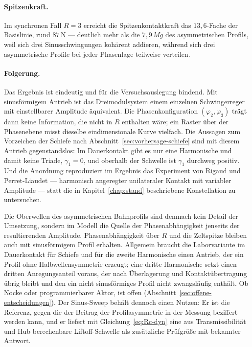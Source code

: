 \documentclass[12pt,a4paper]{report}
\begin{document}
\paragraph{Spitzenkraft.}
Im synchronen Fall $R = 3$ erreicht die Spitzenkontaktkraft das
$13{,}6$-Fache der Basislinie, rund $87\,\mathrm{N}$ --- deutlich mehr
als die $7{,}9\,Mg$ des asymmetrischen Profils, weil sich drei
Sinusschwingungen kohärent addieren, während sich drei asymmetrische
Profile bei jeder Phasenlage teilweise verteilen.

\paragraph{Folgerung.}
Das Ergebnis ist eindeutig und für die Versuchsauslegung bindend. Mit
sinusförmigem Antrieb ist das Dreimodulsystem einem einzelnen
Schwingerreger mit einstellbarer Amplitude äquivalent. Die
Phasenkonfiguration $(\varphi_2, \varphi_3)$ trägt dann keine
Information, die nicht in $R$ enthalten wäre; ein Raster über der
Phasenebene misst dieselbe eindimensionale Kurve vielfach. Die
Aussagen zum Vorzeichen der Schiefe nach
Abschnitt~\ref{sec:vorhersage-schiefe} sind mit diesem Antrieb
gegenstandslos: Im Dauerkontakt gibt es nur eine Harmonische und damit
keine Triade, $\gamma_1 = 0$, und oberhalb der Schwelle ist $\gamma_1$
durchweg positiv. Und die
Anordnung reproduziert im Ergebnis das Experiment von Rigaud und
Perret-Liaudet \cite{rigaud2003} --- harmonisch angeregter unilateraler
Kontakt mit variabler Amplitude --- statt die in
Kapitel~\ref{chap:stand} beschriebene Konstellation zu untersuchen.

Die Oberwellen des asymmetrischen Bahnprofils sind demnach kein Detail
der Umsetzung, sondern im Modell die Quelle der Phasenabhängigkeit
jenseits der resultierenden Amplitude. Phasenabhängigkeit über $R$ und
die Zeltspitze bleiben auch mit sinusförmigem Profil erhalten. Allgemein
braucht die Laborvariante im Dauerkontakt für Schiefe und für die zweite
Harmonische einen Antrieb, der ein Profil ohne Halbwellensymmetrie
erzeugt; eine dritte Harmonische setzt einen dritten Anregungsanteil
voraus, der nach Überlagerung und Kontaktübertragung übrig bleibt und den
ein nicht sinusförmiges Profil nicht zwangsläufig enthält. Ob Nocke oder
programmierbarer Aktor, ist offen
(Abschnitt~\ref{sec:offene-entscheidungen}). Der Sinus-Sweep behält
dennoch einen Nutzen: Er ist die Referenz, gegen die der Beitrag der
Profilasymmetrie in der Messung beziffert werden kann, und er liefert
mit Gleichung~\eqref{eq:Rc-dyn} eine aus Transmissibilität und
Hub berechenbare Liftoff-Schwelle als zusätzliche Prüfgröße mit
bekannter Antwort.
\end{document}

